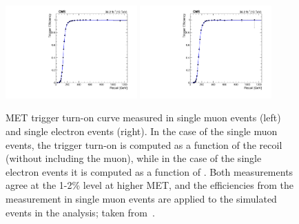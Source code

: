\begin{figure}[hbtp]\begin{center}
    \includegraphics[height=0.45\textwidth,width=0.45\textwidth]{figures/trigs/metTriggerEff_mu.pdf}
    \includegraphics[height=0.45\textwidth,width=0.45\textwidth]{figures/trigs/metTriggerEff_el.pdf}
        \caption{MET trigger turn-on curve measured in single muon events (left) and single electron events (right). In the case of the single muon events, the trigger turn-on is computed as a function of the recoil (\MET without including the muon), while in the case of the single electron events it is computed as a function of \MET. Both measurements agree at the 1-2\% level at higher MET, and the efficiencies from the measurement in single muon events are applied to the simulated events in the analysis; taken from~\cite{CMS_AN_2016-473}. }
    \label{fig:hlteff_met}
 \end{center}\end{figure}


